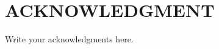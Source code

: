 \documentclass[../report.tex]{subfiles}
\begin{document}
    \section*{ACKNOWLEDGMENT}

    Write your acknowledgments here.
\end{document}
